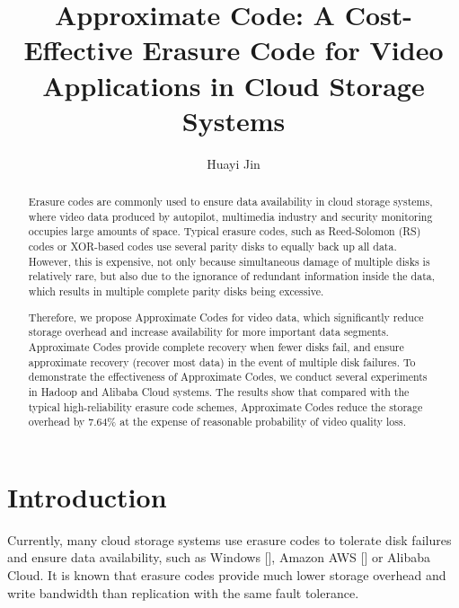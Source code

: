 \documentclass[sigconf]{acmart}
\begin{document}
\title{Approximate Code: A Cost-Effective Erasure Code for Video Applications in Cloud Storage Systems}

\author{Huayi Jin}

\begin{abstract}
Erasure codes are commonly used to ensure data availability in cloud storage systems, where video data produced by autopilot, multimedia industry and security monitoring occupies large amounts of space.
Typical erasure codes, such as Reed-Solomon (RS) \cite{macwilliams1977theory} codes or XOR-based codes use several parity disks to equally back up all data.
However, this is expensive, not only because simultaneous damage of multiple disks is relatively rare, but also due to the ignorance of redundant information inside the data, which results in multiple complete parity disks being excessive.


Therefore, we propose Approximate Codes for video data, which significantly reduce storage overhead and increase availability for more important data segments.
Approximate Codes provide complete recovery when fewer disks fail, and ensure approximate recovery (recover most data) in the event of multiple disk failures.
To demonstrate the effectiveness of Approximate Codes, we conduct several experiments in Hadoop and Alibaba Cloud systems.
The results show that compared with the typical high-reliability erasure code schemes, Approximate Codes reduce the storage overhead by 7.64\% at the expense of reasonable probability of video quality loss.
\end{abstract}

%
%

\maketitle

\section{Introduction}
Currently, many cloud storage systems use erasure codes to tolerate disk failures and ensure data availability, such as Windows [], Amazon AWS [] or Alibaba Cloud. It is known that erasure codes provide much lower storage overhead and write bandwidth than replication with the same fault tolerance.
\end{document}
